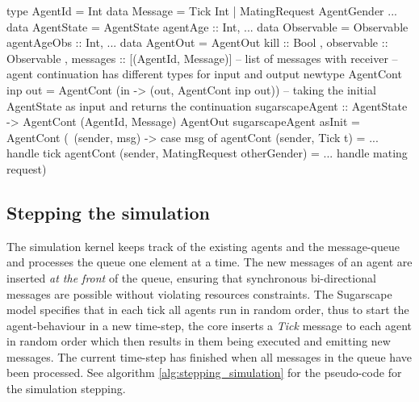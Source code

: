 \begin{HaskellCode}
type AgentId    = Int
data Message    = Tick Int | MatingRequest AgentGender ... 
data AgentState = AgentState { agentAge :: Int, ... }             
data Observable = Observable { agentAgeObs :: Int, ... } 
data AgentOut   = AgentOut
  { kill       :: Bool
  , observable :: Observable
  , messages   :: [(AgentId, Message)] -- list of messages with receiver
  }
-- agent continuation has different types for input and output
newtype AgentCont inp out = AgentCont (in -> (out, AgentCont inp out))
-- taking the initial AgentState as input and returns the continuation
sugarscapeAgent :: AgentState -> AgentCont (AgentId, Message) AgentOut
sugarscapeAgent asInit = AgentCont (\ (sender, msg) -> 
  case msg of
    agentCont (sender, Tick t) = ... handle tick
    agentCont (sender, MatingRequest otherGender) = ... handle mating request)
\end{HaskellCode}

\subsection{Stepping the simulation}
The simulation kernel keeps track of the existing agents and the message-queue and processes the queue one element at a time. The new messages of an agent are inserted \textit{at the front} of the queue, ensuring that synchronous bi-directional messages are possible without violating resources constraints. The Sugarscape model specifies that in each tick all agents run in random order, thus to start the agent-behaviour in a new time-step, the core inserts a \textit{Tick} message to each agent in random order which then results in them being executed and emitting new messages. The current time-step has finished when all messages in the queue have been processed. See algorithm \ref{alg:stepping_simulation} for the pseudo-code for the simulation stepping.
%

